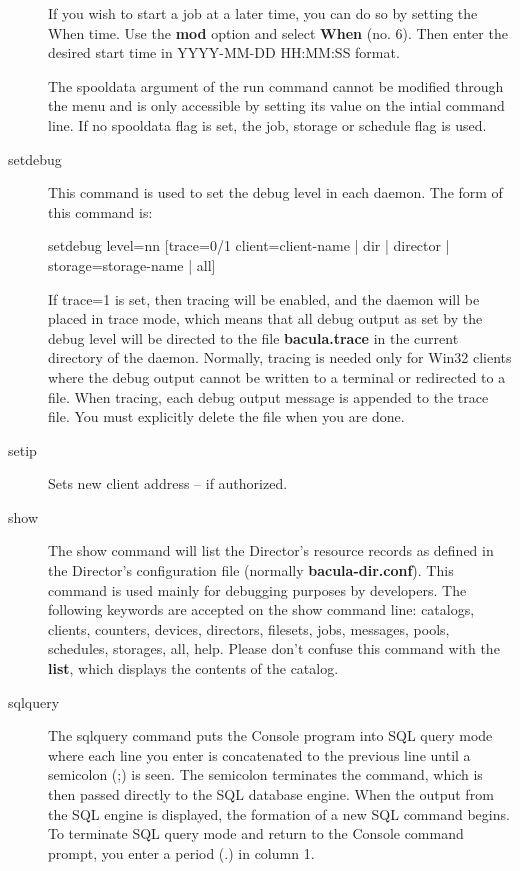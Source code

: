 \begin{description}
\begin{verbatim}
\end{verbatim}
\normalsize

If you wish to start a job at a later time, you can do so by setting  the When
time. Use the {\bf mod} option and select {\bf When} (no. 6).  Then enter the
desired start time in YYYY-MM-DD HH:MM:SS format.

The spooldata argument of the run command cannot be modified through the menu
and is only accessible by setting its value on the intial command line. If
no spooldata flag is set, the job, storage or schedule flag is used.

\item [setdebug]
   This command is used to set the debug level in each  daemon. The form of this
   command is:

setdebug level=nn [trace=0/1 client=\lt{}client-name\gt{} | dir | director |
  storage=\lt{}storage-name\gt{} | all]  

   If trace=1 is set, then tracing will be enabled, and the daemon will be
   placed in trace mode, which means that all debug output as set by the
   debug level will be directed to the file {\bf bacula.trace} in the
   current directory of the daemon.  Normally, tracing is needed only for
   Win32 clients where the debug output cannot be written to a terminal or
   redirected to a file.  When tracing, each debug output message is
   appended to the trace file.  You must explicitly delete the file when
   you are done.

\item [setip]
   Sets new client address -- if authorized.


\item [show]
   The show command will list the Director's resource records as defined in
   the Director's configuration file (normally {\bf bacula-dir.conf}).
   This command is used mainly for debugging purposes by developers.     
   The following keywords are accepted on the
   show command line: catalogs, clients, counters, devices, directors,
   filesets, jobs, messages, pools, schedules, storages, all, help.
   Please don't confuse this command
   with the {\bf list}, which displays the contents of the catalog.

\item [sqlquery]
   The sqlquery command puts the Console program into SQL query mode where
   each line you enter is concatenated to the previous line until a
   semicolon (;) is seen.  The semicolon terminates the command, which is
   then passed directly to the SQL database engine.  When the output from
   the SQL engine is displayed, the formation of a new SQL command begins.
   To terminate SQL query mode and return to the Console command prompt,
   you enter a period (.) in column 1.


\end{description}
